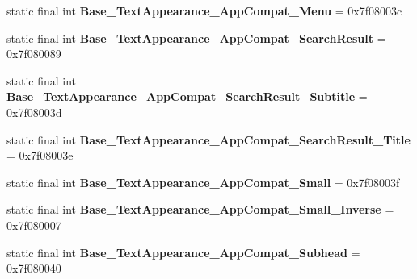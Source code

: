 \begin{DoxyCompactItemize}
\item 
\hypertarget{classandroid_1_1support_1_1design_1_1_r_1_1style_a02a1f468dcd22f86db2c9461e3bed64f}{}static final int {\bfseries Base\+\_\+\+Text\+Appearance\+\_\+\+App\+Compat\+\_\+\+Menu} = 0x7f08003c\label{classandroid_1_1support_1_1design_1_1_r_1_1style_a02a1f468dcd22f86db2c9461e3bed64f}

\item 
\hypertarget{classandroid_1_1support_1_1design_1_1_r_1_1style_a14e4224cdc4bb8704fd715e3af93873f}{}static final int {\bfseries Base\+\_\+\+Text\+Appearance\+\_\+\+App\+Compat\+\_\+\+Search\+Result} = 0x7f080089\label{classandroid_1_1support_1_1design_1_1_r_1_1style_a14e4224cdc4bb8704fd715e3af93873f}

\item 
\hypertarget{classandroid_1_1support_1_1design_1_1_r_1_1style_a37d10e72cc62481528c68beffbf407b7}{}static final int {\bfseries Base\+\_\+\+Text\+Appearance\+\_\+\+App\+Compat\+\_\+\+Search\+Result\+\_\+\+Subtitle} = 0x7f08003d\label{classandroid_1_1support_1_1design_1_1_r_1_1style_a37d10e72cc62481528c68beffbf407b7}

\item 
\hypertarget{classandroid_1_1support_1_1design_1_1_r_1_1style_a3d7e0d19cd7ef91300834b97feba3511}{}static final int {\bfseries Base\+\_\+\+Text\+Appearance\+\_\+\+App\+Compat\+\_\+\+Search\+Result\+\_\+\+Title} = 0x7f08003e\label{classandroid_1_1support_1_1design_1_1_r_1_1style_a3d7e0d19cd7ef91300834b97feba3511}

\item 
\hypertarget{classandroid_1_1support_1_1design_1_1_r_1_1style_aa05b5049493d12c414a207aeea21470f}{}static final int {\bfseries Base\+\_\+\+Text\+Appearance\+\_\+\+App\+Compat\+\_\+\+Small} = 0x7f08003f\label{classandroid_1_1support_1_1design_1_1_r_1_1style_aa05b5049493d12c414a207aeea21470f}

\item 
\hypertarget{classandroid_1_1support_1_1design_1_1_r_1_1style_a49b25eb5aeaf9b46ee955c20c5d74325}{}static final int {\bfseries Base\+\_\+\+Text\+Appearance\+\_\+\+App\+Compat\+\_\+\+Small\+\_\+\+Inverse} = 0x7f080007\label{classandroid_1_1support_1_1design_1_1_r_1_1style_a49b25eb5aeaf9b46ee955c20c5d74325}

\item 
\hypertarget{classandroid_1_1support_1_1design_1_1_r_1_1style_afdbc5e904b5c8a78ec4d8dcf8a976480}{}static final int {\bfseries Base\+\_\+\+Text\+Appearance\+\_\+\+App\+Compat\+\_\+\+Subhead} = 0x7f080040\label{classandroid_1_1support_1_1design_1_1_r_1_1style_afdbc5e904b5c8a78ec4d8dcf8a976480}


\end{DoxyCompactItemize}
